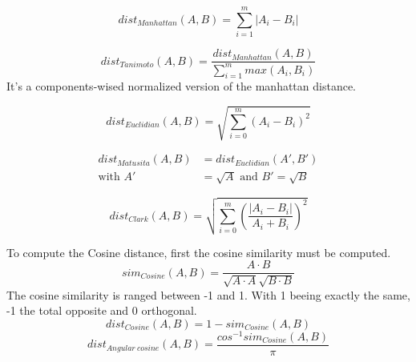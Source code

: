 \begin{definition}
  \begin{equation}
    dist_{Manhattan}(A, B) = \sum_{i=1}^{m} |A_i - B_i|
  \end{equation}
\end{definition}

\begin{definition}
  \begin{equation}
    dist_{Tanimoto}(A, B) = \frac{dist_{Manhattan}(A, B)}{\sum_{i=1}^{m} max(A_i, B_i)}
  \end{equation}
  It's a components-wised normalized version of the manhattan distance.
\end{definition}

\begin{definition}
  \begin{equation}
    dist_{Euclidian}(A, B) = \sqrt{\sum_{i=0}^{m}(A_i - B_i)^2}
  \end{equation}
\end{definition}

\begin{definition}
  \begin{equation}
    \begin{split}
      dist_{Matusita}(A, B) &= dist_{Euclidian}(A', B') \\
      \text{with }A' &= \sqrt{A}\text{ and }B' = \sqrt{B}
    \end{split}
  \end{equation}
\end{definition}

\begin{definition}
  \begin{equation}
    dist_{Clark}(A, B) = \sqrt{\sum_{i=0}^{m}\left(\frac{|A_i - B_i|}{A_i + B_i}\right)^2}
  \end{equation}
\end{definition}

\begin{definition}
  \label{def:cosine_dist}
  To compute the Cosine distance, first the cosine similarity must be computed.
  \begin{equation}
    sim_{Cosine}(A, B) = \frac{A \cdot B}{\sqrt{A \cdot A}\sqrt{B \cdot B}}
  \end{equation}
  The cosine similarity is ranged between -1 and 1.
  With 1 beeing exactly the same, -1 the total opposite and 0 orthogonal.
  \begin{equation}
    dist_{Cosine}(A, B) = 1 - sim_{Cosine}(A, B)
  \end{equation}
  \begin{equation}
    dist_{Angular\ cosine}(A, B) = \frac{cos^{-1}sim_{Cosine}(A, B)}{\pi}
  \end{equation}
\end{definition}

